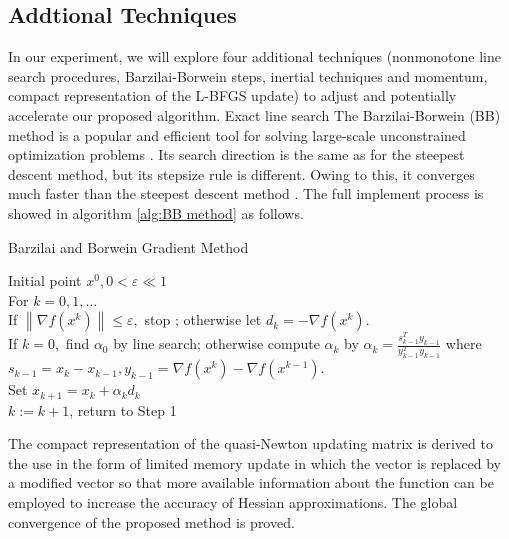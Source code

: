 \documentclass[11pt]{article}
\begin{document}
\subsection{Addtional Techniques}
In our experiment, we will explore four additional techniques (nonmonotone line search procedures, Barzilai-Borwein
steps, inertial techniques and momentum, compact representation of the L-BFGS update) to adjust and potentially accelerate our proposed  algorithm. 
Exact line search 
The Barzilai-Borwein (BB) method is a popular and efficient tool for solving large-scale unconstrained optimization problems \cite{raydan1997barzilai}. Its search direction is the same as for the steepest descent method, but its stepsize rule is different. Owing to this, it converges much faster than the steepest descent method \cite{burdakov2019stabilized}. The full implement process is showed in algorithm \ref{alg:BB method} as follows.

\begin{algorithm}[H]
  \caption{Barzilai and Borwein Gradient Method}
  \label{alg:BB method}
  \begin{algorithmic}[1]
  \REQUIRE
Initial point $x^{0},0<\varepsilon \ll 1 $ \\
  \STATE For $k=0,1, \ldots$ \\
  \STATE If $\left\|\nabla f\left(x^{k}\right)\right\| \leq \varepsilon,$ stop ; otherwise let $d_{k}=-\nabla f\left(x^{k}\right)$. \\
  \STATE If $k=0,$ find $\alpha_{0}$ by line search; otherwise compute $\alpha_{k}$ by 
  $
  \alpha_{k}=\frac{s_{k-1}^{T} y_{k-1}}{y_{k-1}^{T} y_{k-1}}
  $
  where $s_{k-1}=x_{k}-x_{k-1}, y_{k-1}=\nabla f\left(x^{k}\right)-\nabla f\left(x^{k-1}\right)$. \\
  \STATE Set $x_{k+1}=x_{k}+\alpha_{k} d_{k}$ \\
  \STATE $k:=k+1$, return to Step 1 \\
  \end{algorithmic}
\end{algorithm}

The compact representation of the quasi-Newton updating matrix is derived to the use in the form of limited memory update in
which the vector is replaced by a modified vector so that more available information about the function can be
employed to increase the accuracy of Hessian approximations. The global convergence of the proposed method is proved.
\end{document}
